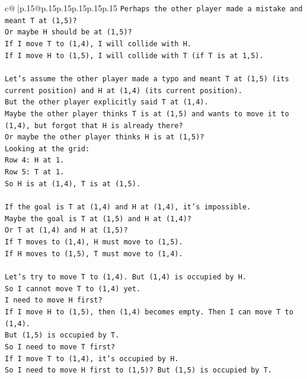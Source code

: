 \documentclass{article}
\begin{document}
{\begin{supertabular}{c@{$\;$}|p{.15\linewidth}@{}p{.15\linewidth}p{.15\linewidth}p{.15\linewidth}p{.15\linewidth}p{.15\linewidth}}
{{{\texttt{Perhaps the other player made a mistake and meant T at (1,5)?} \\
\texttt{Or maybe H should be at (1,5)?} \\
\texttt{If I move T to (1,4), I will collide with H.} \\
\texttt{If I move H to (1,5), I will collide with T (if T is at 1,5).} \\
\\ 
\texttt{Let's assume the other player made a typo and meant T at (1,5) (its current position) and H at (1,4) (its current position).} \\
\texttt{But the other player explicitly said T at (1,4).} \\
\texttt{Maybe the other player thinks T is at (1,5) and wants to move it to (1,4), but forgot that H is already there?} \\
\texttt{Or maybe the other player thinks H is at (1,5)?} \\
\texttt{Looking at the grid:} \\
\texttt{Row 4: H at 1.} \\
\texttt{Row 5: T at 1.} \\
\texttt{So H is at (1,4), T is at (1,5).} \\
\\ 
\texttt{If the goal is T at (1,4) and H at (1,4), it's impossible.} \\
\texttt{Maybe the goal is T at (1,5) and H at (1,4)?} \\
\texttt{Or T at (1,4) and H at (1,5)?} \\
\texttt{If T moves to (1,4), H must move to (1,5).} \\
\texttt{If H moves to (1,5), T must move to (1,4).} \\
\\ 
\texttt{Let's try to move T to (1,4). But (1,4) is occupied by H.} \\
\texttt{So I cannot move T to (1,4) yet.} \\
\texttt{I need to move H first?} \\
\texttt{If I move H to (1,5), then (1,4) becomes empty. Then I can move T to (1,4).} \\
\texttt{But (1,5) is occupied by T.} \\
\texttt{So I need to move T first?} \\
\texttt{If I move T to (1,4), it's occupied by H.} \\
\texttt{So I need to move H first to (1,5)? But (1,5) is occupied by T.} \\
}}}
\end{supertabular}}
\end{document}
